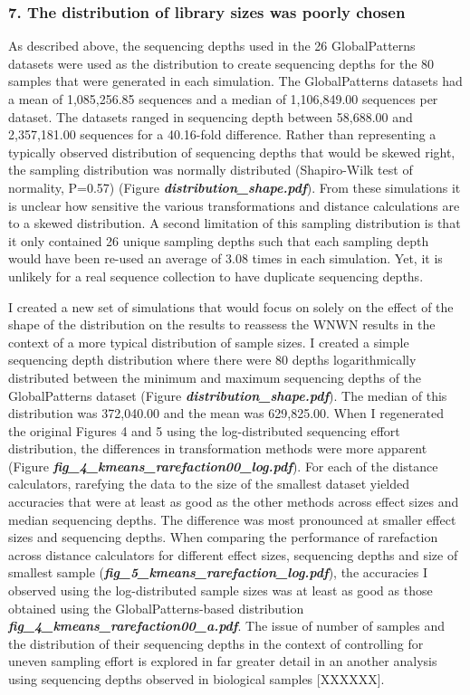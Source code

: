 \documentclass[
]{article}
\begin{document}
\hypertarget{the-distribution-of-library-sizes-was-poorly-chosen}{%
\subsubsection{7. The distribution of library sizes was poorly
chosen}\label{the-distribution-of-library-sizes-was-poorly-chosen}}

As described above, the sequencing depths used in the 26 GlobalPatterns
datasets were used as the distribution to create sequencing depths for
the 80 samples that were generated in each simulation. The
GlobalPatterns datasets had a mean of 1,085,256.85 sequences and a
median of 1,106,849.00 sequences per dataset. The datasets ranged in
sequencing depth between 58,688.00 and 2,357,181.00 sequences for a
40.16-fold difference. Rather than representing a typically observed
distribution of sequencing depths that would be skewed right, the
sampling distribution was normally distributed (Shapiro-Wilk test of
normality, P=0.57) (Figure \textbf{\emph{distribution\_shape.pdf}}).
From these simulations it is unclear how sensitive the various
transformations and distance calculations are to a skewed distribution.
A second limitation of this sampling distribution is that it only
contained 26 unique sampling depths such that each sampling depth would
have been re-used an average of 3.08 times in each simulation. Yet, it
is unlikely for a real sequence collection to have duplicate sequencing
depths.

I created a new set of simulations that would focus on solely on the
effect of the shape of the distribution on the results to reassess the
WNWN results in the context of a more typical distribution of sample
sizes. I created a simple sequencing depth distribution where there were
80 depths logarithmically distributed between the minimum and maximum
sequencing depths of the GlobalPatterns dataset (Figure
\textbf{\emph{distribution\_shape.pdf}}). The median of this
distribution was 372,040.00 and the mean was 629,825.00. When I
regenerated the original Figures 4 and 5 using the log-distributed
sequencing effort distribution, the differences in transformation
methods were more apparent (Figure
\textbf{\emph{fig\_4\_kmeans\_rarefaction00\_log.pdf}}). For each of the
distance calculators, rarefying the data to the size of the smallest
dataset yielded accuracies that were at least as good as the other
methods across effect sizes and median sequencing depths. The difference
was most pronounced at smaller effect sizes and sequencing depths. When
comparing the performance of rarefaction across distance calculators for
different effect sizes, sequencing depths and size of smallest sample
(\textbf{\emph{fig\_5\_kmeans\_rarefaction\_log.pdf}}), the accuracies I
observed using the log-distributed sample sizes was at least as good as
those obtained using the GlobalPatterns-based distribution
\textbf{\emph{fig\_4\_kmeans\_rarefaction00\_a.pdf}}. The issue of
number of samples and the distribution of their sequencing depths in the
context of controlling for uneven sampling effort is explored in far
greater detail in an another analysis using sequencing depths observed
in biological samples {[}XXXXXX{]}.
\end{document}
